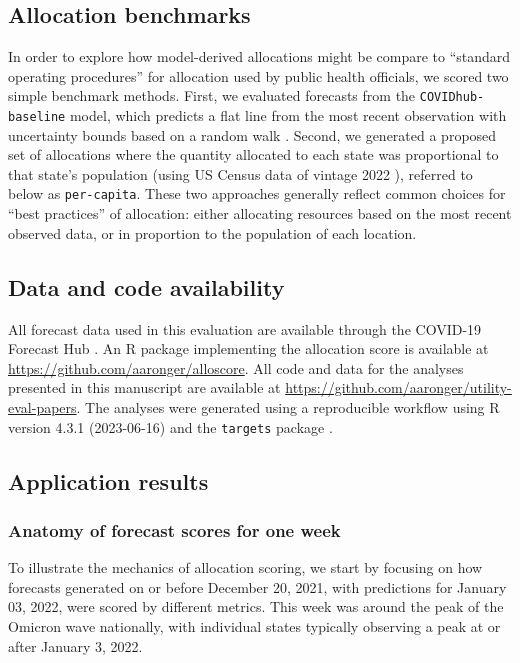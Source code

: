 \documentclass{article}\usepackage[]{graphicx}\usepackage[]{xcolor}
\begin{document}
\subsection{Allocation benchmarks}

In order to explore how model-derived allocations might be compare to ``standard operating procedures'' for allocation
used by public health officials, we scored two simple benchmark methods. First, we evaluated forecasts from the
\texttt{COVIDhub-baseline} model, which predicts a flat line from the most recent observation with uncertainty bounds
based on a random walk \citep{cramer_evaluation_2022}. Second, we generated a proposed set of allocations where the
quantity allocated to each state was proportional to that state's population (using US Census data of vintage 2022
\citep{us_census_nst_est2022}), referred to below as \texttt{per-capita}. These two approaches generally reflect common
choices for ``best practices'' of allocation: either allocating resources based on the most recent observed data, or in
proportion to the population of each location. 

\subsection{Data and code availability}

All forecast data used in this evaluation are available through the COVID-19 Forecast Hub \citep{cramer_united_2022}. An
R package implementing the allocation score is available at \url{https://github.com/aaronger/alloscore}. All code and
data for the analyses presented in this manuscript are available at
\url{https://github.com/aaronger/utility-eval-papers}. The analyses were generated using a reproducible workflow using
R version 4.3.1 (2023-06-16) and the {\tt targets} package \citep{Rcore-2023, landau_2021_targets}.

\subsection{Application results}







\subsubsection{Anatomy of forecast scores for one week}

To illustrate the mechanics of allocation scoring, we start by focusing on how forecasts generated on or before December
20, 2021, with predictions for January 03, 2022, were scored by different metrics. This week was around the peak of the
Omicron wave nationally, with individual states typically observing a peak at or after January 3, 2022.
\end{document}
